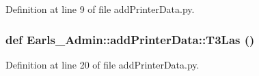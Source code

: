 Definition at line 9 of file addPrinterData.py.\hypertarget{namespaceEarls__Admin_1_1addPrinterData_5e761e876d75917a09b140eb58e6e7ab}{
\subsubsection[T3Las]{\setlength{\rightskip}{0pt plus 5cm}def Earls\_\-Admin::addPrinterData::T3Las ()}}
\label{namespaceEarls__Admin_1_1addPrinterData_5e761e876d75917a09b140eb58e6e7ab}




Definition at line 20 of file addPrinterData.py.